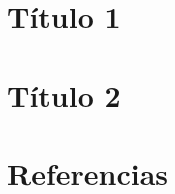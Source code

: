 \documentclass[oneside,openany]{book}
\begin{document}


\setcounter{page}{1}

\chapter{Título 1} %


\chapter{Título 2}


\chapter*{Referencias}

\end{document}
